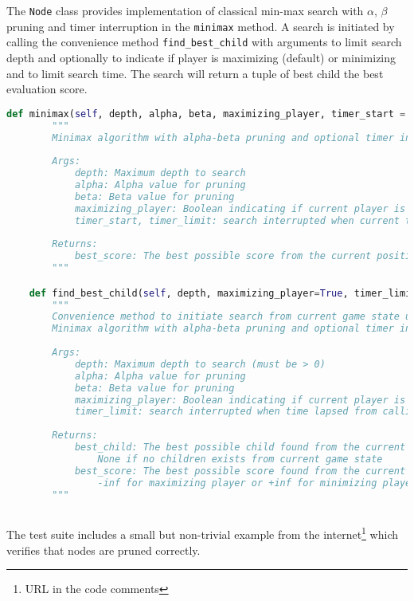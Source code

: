 \documentclass[a4paper]{article}
\begin{document}
The \texttt{Node} class provides implementation of classical min-max search with $\alpha$, $\beta$ pruning and timer interruption in the \verb|minimax| method. A search is initiated by calling the convenience method \verb|find_best_child| with arguments to limit search depth and optionally to indicate if player is maximizing (default) or minimizing and to limit search time. The search will return a tuple of best child the best evaluation score.
\begin{lstlisting}[language=Python]
    def minimax(self, depth, alpha, beta, maximizing_player, timer_start = 0, timer_limit = float('inf')):
        """
        Minimax algorithm with alpha-beta pruning and optional timer interruption.
        
        Args:
            depth: Maximum depth to search
            alpha: Alpha value for pruning
            beta: Beta value for pruning
            maximizing_player: Boolean indicating if current player is maximizing
            timer_start, timer_limit: search interrupted when current time exceeds timer_start + timer_limit
        
        Returns:
            best_score: The best possible score from the current position
        """

    def find_best_child(self, depth, maximizing_player=True, timer_limit = float('inf')):
        """
        Convenience method to initiate search from current game state using
        Minimax algorithm with alpha-beta pruning and optional timer interruption.
        
        Args:
            depth: Maximum depth to search (must be > 0)
            alpha: Alpha value for pruning
            beta: Beta value for pruning
            maximizing_player: Boolean indicating if current player is maximizing
            timer_limit: search interrupted when time lapsed from calling this method exceeds timer_limit
        
        Returns:
            best_child: The best possible child found from the current node
                None if no children exists from current game state 
            best_score: The best possible score found from the current node
                -inf for maximizing player or +inf for minimizing player if no children exists from current game state  
        """
        
\end{lstlisting} 

The test suite includes a small but non-trivial example from the internet\footnote{URL in the code comments} which verifies that nodes are pruned correctly.
\end{document}
